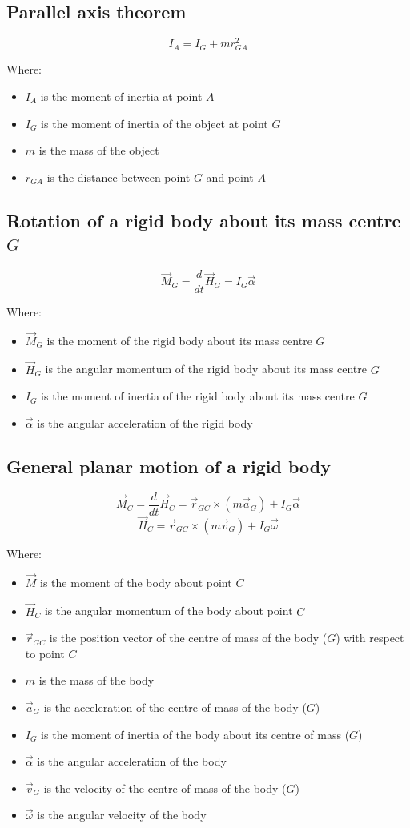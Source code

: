 \documentclass[11pt]{article}
\begin{document}
\subsection{Parallel axis theorem}
\label{sec:org2a0a416}
\[I_A = I_G + mr_{GA}^2\]

Where:
\begin{itemize}
\item \(I_A\) is the moment of inertia at point \(A\)
\item \(I_G\) is the moment of inertia of the object at point \(G\)
\item \(m\) is the mass of the object
\item \(r_{GA}\) is the distance between point \(G\) and point \(A\)
\end{itemize}
\subsection{Rotation of a rigid body about its mass centre \(G\)}
\label{sec:org7bb1606}
\[\vec{M}_G = \frac{d}{dt} \vec{H}_G = I_G \vec{\alpha}\]

Where:
\begin{itemize}
\item \(\vec{M}_G\) is the moment of the rigid body about its mass centre \(G\)
\item \(\vec{H}_G\) is the angular momentum of the rigid body about its mass centre \(G\)
\item \(I_G\) is the moment of inertia of the rigid body about its mass centre \(G\)
\item \(\vec{\alpha}\) is the angular acceleration of the rigid body
\end{itemize}
\subsection{General planar motion of a rigid body}
\label{sec:org11bc533}
\[\vec{M}_C = \frac{d}{dt} \vec{H}_C = \vec{r}_{GC} \times (m \vec{a}_G) + I_G \vec{\alpha}\]
\[\vec{H}_C = \vec{r}_{GC} \times (m \vec{v}_G) + I_{G} \vec{\omega}\]

Where:
\begin{itemize}
\item \(\vec{M}\) is the moment of the body about point \(C\)
\item \(\vec{H}_C\) is the angular momentum of the body about point \(C\)
\item \(\vec{r}_{GC}\) is the position vector of the centre of mass of the body (\(G\)) with respect to point \(C\)
\item \(m\) is the mass of the body
\item \(\vec{a}_G\) is the acceleration of the centre of mass of the body (\(G\))
\item \(I_G\) is the moment of inertia of the body about its centre of mass (\(G\))
\item \(\vec{\alpha}\) is the angular acceleration of the body
\item \(\vec{v}_G\) is the velocity of the centre of mass of the body (\(G\))
\item \(\vec{\omega}\) is the angular velocity of the body
\end{itemize}
\end{document}
